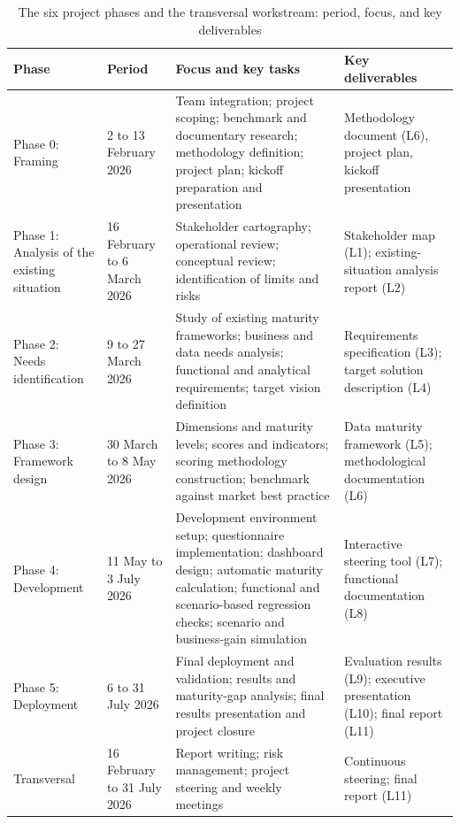 \begin{landscape}
\begin{table}[H]
\centering
\caption{The six project phases and the transversal workstream: period, focus, and key deliverables} \label{tab:project-phases}

\footnotesize
\setlength{\tabcolsep}{4pt}
\begin{tabular}{|p{2.6cm}|p{3.0cm}|p{10.2cm}|p{6.4cm}|}
\hline
\textbf{Phase} & \textbf{Period} & \textbf{Focus and key tasks} & \textbf{Key deliverables} \\
\hline
Phase 0: Framing & 2 to 13 February 2026 & Team integration; project scoping; benchmark and documentary research; methodology definition; project plan; kickoff preparation and presentation & Methodology document (L6), project plan, kickoff presentation \\
\hline
Phase 1: Analysis of the existing situation & 16 February to 6 March 2026 & Stakeholder cartography; operational review; conceptual review; identification of limits and risks & Stakeholder map (L1); existing-situation analysis report (L2) \\
\hline
Phase 2: Needs identification & 9 to 27 March 2026 & Study of existing maturity frameworks; business and data needs analysis; functional and analytical requirements; target vision definition & Requirements specification (L3); target solution description (L4) \\
\hline
Phase 3: Framework design & 30 March to 8 May 2026 & Dimensions and maturity levels; scores and indicators; scoring methodology construction; benchmark against market best practice & Data maturity framework (L5); methodological documentation (L6) \\
\hline
Phase 4: Development & 11 May to 3 July 2026 & Development environment setup; questionnaire implementation; dashboard design; automatic maturity calculation; functional and scenario-based regression checks; scenario and business-gain simulation & Interactive steering tool (L7); functional documentation (L8) \\
\hline
Phase 5: Deployment & 6 to 31 July 2026 & Final deployment and validation; results and maturity-gap analysis; final results presentation and project closure & Evaluation results (L9); executive presentation (L10); final report (L11) \\
\hline
Transversal & 16 February to 31 July 2026 & Report writing; risk management; project steering and weekly meetings & Continuous steering; final report (L11) \\
\hline
\end{tabular}

\end{table}
\end{landscape}


